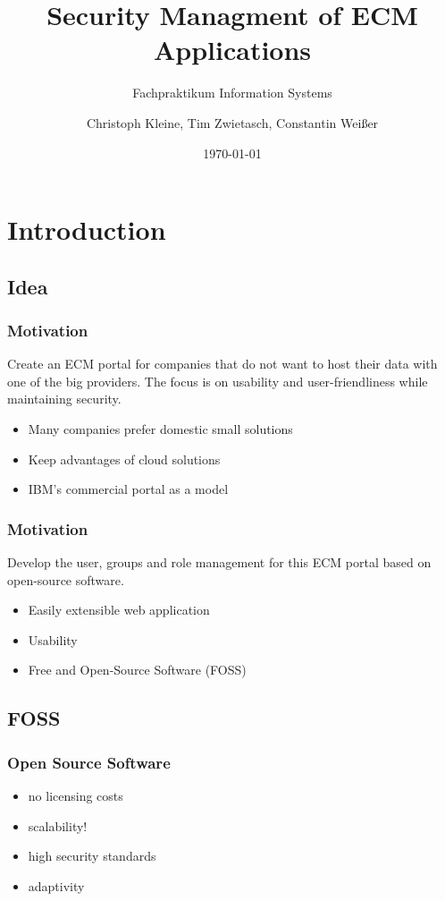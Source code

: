 \documentclass{beamer}
\title{Security Managment of ECM Applications}
\subtitle{Fachpraktikum Information Systems}
\author{Christoph Kleine, Tim Zwietasch, Constantin Weißer}
\date{\today}
\begin{document}
\frame{\titlepage}

\section{Introduction}
\subsection{Idea}
\begin{frame}
	\frametitle{Motivation}
	\begin{tcolorbox}[title=Overall Goal]
		Create an ECM portal for companies that do not want to host
		their data with one of the big providers. The focus is on
		usability and user-friendliness while maintaining security.
	\end{tcolorbox}

	\begin{itemize}
		\item Many companies prefer domestic small solutions
		\item Keep advantages of cloud solutions
		\item IBM's commercial portal as a model
	\end{itemize}
\end{frame}

\begin{frame}
	\frametitle{Motivation}
	\begin{tcolorbox}[title=Our Goal]
		Develop the user, groups and role management for this ECM portal
		based on open-source software.
	\end{tcolorbox}
	\begin{itemize}
		\item Easily extensible web application
		\item Usability
		\item Free and Open-Source Software (FOSS)
	\end{itemize}
\end{frame}

\subsection{FOSS}
\begin{frame}
	\frametitle{Open Source Software}
	\begin{tcolorbox}[title=Why use FOSS components?]
		\begin{itemize}
			\item no licensing costs
			\item scalability!
			\item high security standards
			\item adaptivity
		\end{itemize}
	\end{tcolorbox}
\end{frame}
\end{document}
